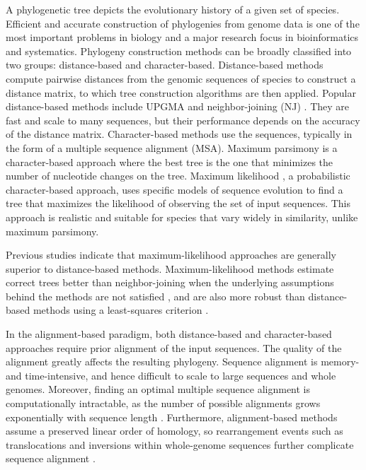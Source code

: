 \documentclass[11pt]{article}
\begin{document}
A phylogenetic tree depicts the evolutionary history of a given set of species. Efficient and accurate construction of phylogenies from genome data is one of the most important problems in biology and a major research focus in bioinformatics and systematics. Phylogeny construction methods can be broadly classified into two groups: distance-based and character-based. Distance-based methods compute pairwise distances from the genomic sequences of species to construct a distance matrix, to which tree construction algorithms are then applied. Popular distance-based methods include UPGMA \cite{sokal1958upgma} and neighbor-joining (NJ) \cite{saitou1987nj}. They are fast and scale to many sequences, but their performance depends on the accuracy of the distance matrix. Character-based methods use the sequences, typically in the form of a multiple sequence alignment (MSA). Maximum parsimony \cite{fitch1971parsimony} is a character-based approach where the best tree is the one that minimizes the number of nucleotide changes on the tree. Maximum likelihood \cite{felsenstein1981ml}, a probabilistic character-based approach, uses specific models of sequence evolution to find a tree that maximizes the likelihood of observing the set of input sequences. This approach is realistic and suitable for species that vary widely in similarity, unlike maximum parsimony.

Previous studies indicate that maximum-likelihood approaches are generally superior to distance-based methods. Maximum-likelihood methods estimate correct trees better than neighbor-joining when the underlying assumptions behind the methods are not satisfied \cite{kuhner1994mlnj}, and are also more robust than distance-based methods using a least-squares criterion \cite{felsenstein2004book}.

In the alignment-based paradigm, both distance-based and character-based approaches require prior alignment of the input sequences. The quality of the alignment greatly affects the resulting phylogeny. Sequence alignment is memory- and time-intensive, and hence difficult to scale to large sequences and whole genomes. Moreover, finding an optimal multiple sequence alignment is computationally intractable, as the number of possible alignments grows exponentially with sequence length \cite{zielezinski2017afreview}. Furthermore, alignment-based methods assume a preserved linear order of homology, so rearrangement events such as translocations and inversions within whole-genome sequences further complicate sequence alignment \cite{zielezinski2017afreview}.
\end{document}
